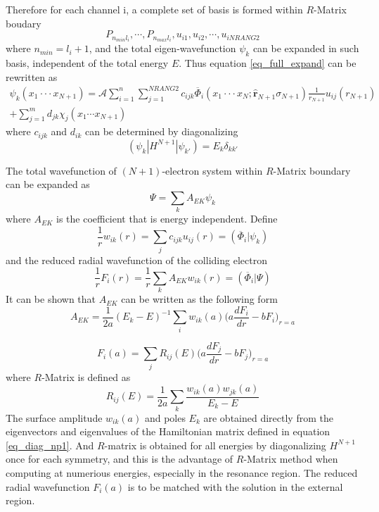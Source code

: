 Therefore for each channel i, a complete set of basis is formed within $R$-Matrix boudary
\begin{equation}
	P_{n_{min}l_i}, \cdots, P_{n_{max}l_i}, u_{i1}, u_{i2}, \cdots, u_{i NRANG2}
\end{equation}
where $n_{min} = l_i+1$, and the total eigen-wavefunction $\psi_k$ can be expanded in such basis, independent of the total energy $E$. Thus equation \ref{eq_full_expand} can be rewritten as
\begin{multline} \label{eq_full_expand_cont_basis}
	\psi_k(x_1\cdot\cdot\cdot x_{N+1}) = \mathcal{A}\sum_{i=1}^{n}\sum_{j=1}^{NRANG2}c_{ijk}\overline{\Phi}_i(x_1\cdot\cdot\cdot x_{N}; \hat{\textbf{r}}_{N+1}\sigma_{N+1}) \frac{1}{r_{N+1}} u_{ij}(r_{N+1}) \\+ \sum_{j=1}^m d_{jk} \chi_j(x_1\cdots x_{N+1}) 
\end{multline}
where $c_{ijk}$ and $d_{ik}$ can be determined by diagonalizing 
\begin{equation} \label{eq_diag_np1}
	(\psi_k|H^{N+1}|\psi_{k'}) = E_k\delta_{kk'}
\end{equation}

The total wavefunction of $(N+1)$-electron system within $R$-Matrix boundary can be expanded as 
\begin{equation}
	\Psi = \sum_k A_{EK} \psi_k
\end{equation}
where $A_{EK}$ is the coefficient that is energy independent. Define
\begin{equation}
	\frac{1}{r}w_{ik}(r) = \sum_j c_{ijk}u_{ij}(r) = (\overline{\Phi}_i|\psi_k)
\end{equation}
and the reduced radial wavefunction of the colliding electron
\begin{equation}
	\frac{1}{r}F_i(r) = \frac{1}{r} \sum_k A_{EK} w_{ik}(r) = (\overline{\Phi}_i|\Psi)
\end{equation}
It can be shown that $A_{EK}$ can be written as the following form
\begin{equation}
	A_{EK} = \frac{1}{2a} (E_k-E)^{-1} \sum_i w_{ik}(a) \Bigg( a\frac{dF_i}{dr} - bF_i \Bigg)_{r=a}
\end{equation}

\begin{equation} \label{eq_rm_a}
	F_i(a) = \sum_j R_{ij}(E) \Bigg( a\frac{dF_j}{dr} - bF_j \Bigg)_{r=a}
\end{equation}
where $R$-Matrix is defined as 
\begin{equation} \label{eq_rm_boundary}
	R_{ij}(E) = \frac{1}{2a} \sum_k \frac{w_{ik}(a)w_{jk}(a)}{E_k - E}
\end{equation}
The surface amplitude $w_{ik}(a)$ and poles $E_k$ are obtained directly from the eigenvectors and eigenvalues of the Hamiltonian matrix defined in equation \ref{eq_diag_np1}. And $R$-matrix is obtained for all energies by diagonalizing $H^{N+1}$ once for each symmetry, and this is the advantage of $R$-Matrix method when computing at numerious energies, especially in the resonance region. The reduced radial wavefunction $F_i(a)$ is to be matched with the solution in the external region.


